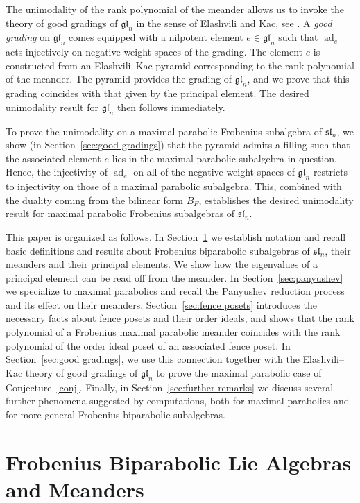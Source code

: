 \documentclass{amsart}
\def\sl{\mathfrak{sl}}
\def\gl{\mathfrak{gl}}
\def\sln{\sl_n}
\def\gln{\gl_n}
\def\ad{\operatorname{ad}}
\theoremstyle{definition}
\begin{document}
The unimodality of the rank polynomial of the meander allows us to invoke the theory of good gradings of $\gln$ in the sense of Elashvili and Kac, see \cite{elashvili2005classification}. A \emph{good grading} on $\gln$ comes equipped with a nilpotent element $e\in \gln$ such that $\ad_e$ acts injectively on negative weight spaces of the grading. The element $e$ is constructed from an Elashvili--Kac pyramid corresponding to the rank polynomial of the meander. The pyramid provides the grading of $\gln$, and we prove that this grading coincides with that given by the principal element. The desired unimodality result for $\gln$ then follows immediately. 

To prove the unimodality on a maximal parabolic Frobenius subalgebra of $\sln$, we show (in Section~\ref{sec:good gradings}) that the pyramid admits a filling such that the associated element $e$ lies in the maximal parabolic subalgebra in question. Hence, the injectivity of $\ad_e$ on all of the negative weight spaces of $\gln$ restricts to injectivity on those of a maximal parabolic subalgebra. This, combined with the duality coming from the bilinear form $B_F$, establishes the desired unimodality result for maximal parabolic Frobenius subalgebras of $\sln$.

This paper is organized as follows. In Section~\ref{sec:frobenius} we establish notation and recall basic definitions and results about Frobenius biparabolic subalgebras of $\sln$, their meanders and their principal elements. We show how the eigenvalues of a principal element can be read off from the meander. In Section~\ref{sec:panyushev} we specialize to maximal parabolics and recall the Panyushev reduction process and its effect on their meanders. Section~\ref{sec:fence posets} introduces the necessary facts about fence posets and their order ideals, and shows that the rank polynomial of a Frobenius maximal parabolic meander coincides with the rank polynomial of the order ideal poset of an associated fence poset. In Section~\ref{sec:good gradings}, we use this connection together with the Elashvili--Kac theory of good gradings of $\gln$ to prove the maximal parabolic case of Conjecture~\ref{conj}. Finally, in Section~\ref{sec:further remarks} we discuss several further phenomena suggested by computations, both for maximal parabolics and for more general Frobenius biparabolic subalgebras.


\section{Frobenius Biparabolic Lie Algebras and Meanders}
\label{sec:frobenius}
\end{document}

